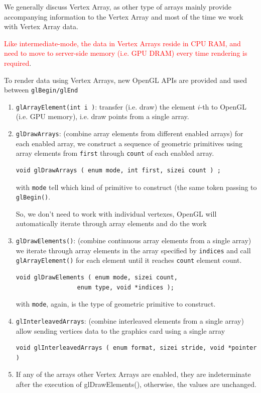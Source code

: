 \begin{framed}
  We generally discuss Vertex Array, as other type of arrays mainly
  provide accompanying information to the Vertex Array and most of the
  time we work with Vertex Array data.

  \textcolor{red}{Like intermediate-mode, the data in Vertex Arrays
    reside in CPU RAM, and need to move to server-side memory (i.e. GPU
    DRAM) every time rendering is required}.
\end{framed}


To render data using Vertex Arrays, new OpenGL APIs are provided and
used between \verb!glBegin/glEnd!

\begin{enumerate}
\item \verb!glArrayElement(int i )!: transfer (i.e. draw) the element
  $i$-th to OpenGL (i.e. GPU memory), i.e. draw points from a single
  array.

\item \verb!glDrawArrays!: (combine array elements from different
  enabled arrays) for each enabled array, we construct a sequence of
  geometric primitives using array elements from \verb!first! through
  \verb!count! of each enabled array.
\begin{verbatim}
void glDrawArrays ( enum mode, int first, sizei count ) ;
\end{verbatim}
  with \verb!mode! tell which kind of primitive to construct (the same
  token passing to \verb!glBegin()!. 

  So, we don't need to work with individual vertexes, OpenGL will
  automatically iterate through array elements and do the work

\item \verb!glDrawElements()!: (combine continuous array elements from
  a single array) we iterate through array elements in the array
  specified by \verb!indices! and call \verb!glArrayElement()! for
  each element until it reaches \verb!count! element count.
\begin{verbatim}
void glDrawElements ( enum mode, sizei count, 
                 enum type, void *indices );
\end{verbatim}
  with \verb!mode!, again, is the type of geometric primitive to
  construct. 

\item \verb!glInterleavedArrays!: (combine interleaved elements from a
  single array) allow sending vertices data to the graphics card using
  a single array
\begin{verbatim}
void glInterleavedArrays ( enum format, sizei stride, void *pointer )
\end{verbatim}

\item If any of the arrays other Vertex Arrays are enabled, they are
  indeterminate after the execution of glDrawElements(), otherwise,
  the values are unchanged. 
\end{enumerate}

